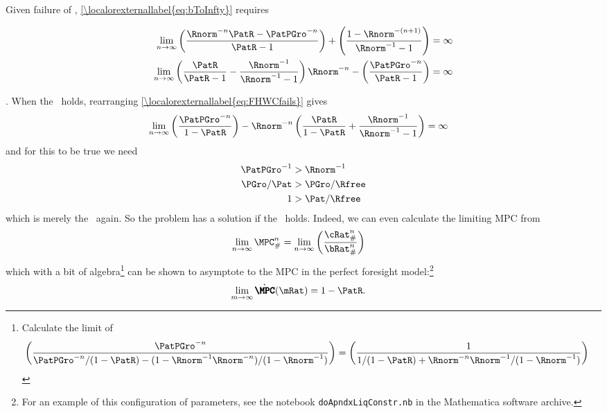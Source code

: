 \documentclass[\econtexRoot/BufferStockTheory.tex]{subfiles}
\begin{document}
Given failure of \FHWC, \eqref{\localorexternallabel{eq:bToInfty}} requires

\begin{align}
  \lim_{n \rightarrow \infty} \left(\frac{\Rnorm^{-n}\PatR-\PatPGro^{-n}}{\PatR-1}\right) + \left(\frac{1-\Rnorm^{-(n+1)}}{\Rnorm^{-1}-1}\right)  & = \infty \notag
\\   \lim_{n \rightarrow \infty} \left(\frac{\PatR}{\PatR-1}-\frac{\Rnorm^{-1}}{\Rnorm^{-1}-1}\right)\Rnorm^{-n}-\left(\frac{\PatPGro^{-n}}{\PatR-1}\right)  & = \infty \label{eq:FHWCfails} 
\end{align}

.  When the \RIC~holds, rearranging \eqref{\localorexternallabel{eq:FHWCfails}} gives
\begin{eqnarray*}
  \lim_{n \rightarrow \infty} \left(\frac{\PatPGro^{-n}}{1-\PatR}\right)-\Rnorm^{-n}\left(\frac{\PatR}{1-\PatR}+\frac{\Rnorm^{-1}}{\Rnorm^{-1}-1}\right)  & = \infty
\end{eqnarray*}
and for this to be true we need
\begin{eqnarray*}
  \PatPGro^{-1}  & > \Rnorm^{-1}
\\ \PGro/\Pat  & > \PGro/\Rfree
\\ 1  & > \Pat/\Rfree
\end{eqnarray*}
which is merely the \RIC~again.  So the problem has a solution if the \RIC~holds.  Indeed,
we can even calculate the limiting MPC from
\begin{align}
  \lim_{n \rightarrow \infty} \MPC^{n}_{\#}  & = \lim_{n \rightarrow \infty} \left(\frac{\cRat_{\#}^{n}}{\bRat_{\#}^{n}}\right) \label{eq:MPCConstrLim}
\end{align}
which with a bit of algebra\footnote{
Calculate the limit of
\begin{align}
\left(\frac{\PatPGro^{-n}}{\PatPGro^{-n}/(1-\PatR) - (1-\Rnorm^{-1}\Rnorm^{-n})/(1-\Rnorm^{-1})}\right)  & = \left(\frac{1}{1/(1-\PatR) + \Rnorm^{-n}\Rnorm^{-1}/(1-\Rnorm^{-1})}\right)
\end{align}} can be shown to asymptote to the MPC in the perfect foresight model:\footnote{For an example of this configuration of parameters, see the notebook \texttt{doApndxLiqConstr.nb} in the Mathematica software  archive.}
\begin{align}
  \lim_{m \rightarrow \infty} \grave{\pmb{\MPC}}(\mRat)  & = 1-\PatR.
\end{align}
\end{document}
